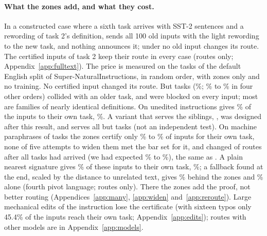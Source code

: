 \paragraph{What the zones add, and what they cost.}\label{sec:stress}\label{sec:many} In a constructed case
where a sixth task arrives with SST-2 sentences and a rewording of task 2's definition, \nearest{} sends
all 100 old inputs with the light rewording to the new task, and nothing announces it; under \cert{} no
old input changes its route. The certified inputs of task 2
keep their route in every case (routes only; Appendix~\ref{app:fulltext}). The price is measured on the
\ManyTasks{} tasks of the default English split of Super-NaturalInstructions, in random order, with
zones only and no training. No certified input changed its route. But \ManyColliding{} tasks
(\ManyCollidingPct{}\%; \ManyCollidingPctLow{}\% to \ManyCollidingPctHigh{}\% in four other orders)
collided with an older task, and \ManyAllHeld{} were blocked on every input; most are families of
nearly identical definitions. On unedited instructions \nearest{} gives
\ManyNearRightPct{}\% of the inputs to their own task, \cert{} \ManyCertRightPct{}\%. A variant that serves
the siblings, \exactfirst{}, was designed after this result, and serves all but \ExactTasksNone{} tasks
(not an independent test). On machine paraphrases of \WidenTasksEval{} tasks the zones certify only
\WidenRefTfivePLow{}\% to \WidenRefTfivePHigh{}\% of inputs for their own task, none of five attempts to
widen them met the bar set for it, and \nearest{} changed \RerouteNearNChanged{} of \RerouteInputs{} routes
after all tasks had arrived (we had expected \RerouteExpectNearLow{}\% to \RerouteExpectNearHigh{}\%),
the same as \cert{}. A plain nearest signature gives \RerouteSigOwnEnd{}\% of these inputs to their own task,
\cert{} \RerouteCertOwnEnd{}\%; a fallback found at the end, scaled by the distance to unrelated text,
gives \RerouteCertFourItOwn{}\% behind the zones and \RerouteBgItOwn{}\% alone (fourth pivot language; routes only). There the zones add the proof, not better routing (Appendices~\ref{app:many},
\ref{app:widen} and~\ref{app:reroute}).\label{sec:edits}\label{sec:models} Large mechanical edits of the instruction lose the
certificate (with sixteen typos only 45.4\% of the inputs reach their own task; Appendix~\ref{app:edits});
routes with other models are in Appendix~\ref{app:models}.
